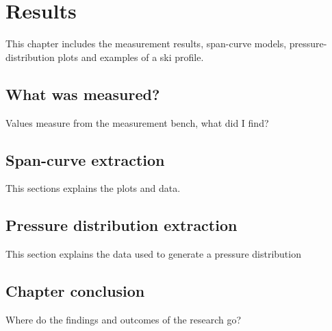 \chapter{Results}
This chapter includes the measurement results, span-curve models, pressure-distribution plots and examples of a ski profile.

\section{What was measured?}
Values measure from the measurement bench, what did I find?

\section{Span-curve extraction}
This sections explains the plots and data.

\section{Pressure distribution extraction}
This section explains the data used to generate a pressure distribution

\section{Chapter conclusion}
Where do the findings and outcomes of the research go?